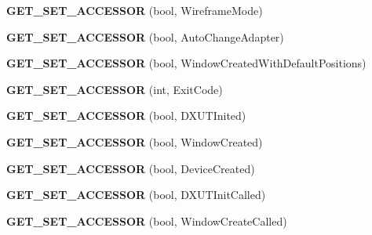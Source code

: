 \begin{DoxyCompactItemize}
\item 
\hypertarget{class_d_x_u_t_state_a59311ccadc02bef1fcce1ee052ceecb9}{{\bfseries G\+E\+T\+\_\+\+S\+E\+T\+\_\+\+A\+C\+C\+E\+S\+S\+O\+R} (bool, Wireframe\+Mode)}\label{class_d_x_u_t_state_a59311ccadc02bef1fcce1ee052ceecb9}

\item 
\hypertarget{class_d_x_u_t_state_a2bb10450426c21bb4a86a8b979d9afca}{{\bfseries G\+E\+T\+\_\+\+S\+E\+T\+\_\+\+A\+C\+C\+E\+S\+S\+O\+R} (bool, Auto\+Change\+Adapter)}\label{class_d_x_u_t_state_a2bb10450426c21bb4a86a8b979d9afca}

\item 
\hypertarget{class_d_x_u_t_state_af8afc1f310b2c7e1a68aa6730c142b6c}{{\bfseries G\+E\+T\+\_\+\+S\+E\+T\+\_\+\+A\+C\+C\+E\+S\+S\+O\+R} (bool, Window\+Created\+With\+Default\+Positions)}\label{class_d_x_u_t_state_af8afc1f310b2c7e1a68aa6730c142b6c}

\item 
\hypertarget{class_d_x_u_t_state_a00c1bce1dc49ad37f1d7a1d517bfe2c1}{{\bfseries G\+E\+T\+\_\+\+S\+E\+T\+\_\+\+A\+C\+C\+E\+S\+S\+O\+R} (int, Exit\+Code)}\label{class_d_x_u_t_state_a00c1bce1dc49ad37f1d7a1d517bfe2c1}

\item 
\hypertarget{class_d_x_u_t_state_a7170f07f98ca52e76967d166e7fc5323}{{\bfseries G\+E\+T\+\_\+\+S\+E\+T\+\_\+\+A\+C\+C\+E\+S\+S\+O\+R} (bool, D\+X\+U\+T\+Inited)}\label{class_d_x_u_t_state_a7170f07f98ca52e76967d166e7fc5323}

\item 
\hypertarget{class_d_x_u_t_state_a1c6c3de8f9aae7efa32d603d18953c13}{{\bfseries G\+E\+T\+\_\+\+S\+E\+T\+\_\+\+A\+C\+C\+E\+S\+S\+O\+R} (bool, Window\+Created)}\label{class_d_x_u_t_state_a1c6c3de8f9aae7efa32d603d18953c13}

\item 
\hypertarget{class_d_x_u_t_state_a80fe40845dbc6d77ee04510e15c929c0}{{\bfseries G\+E\+T\+\_\+\+S\+E\+T\+\_\+\+A\+C\+C\+E\+S\+S\+O\+R} (bool, Device\+Created)}\label{class_d_x_u_t_state_a80fe40845dbc6d77ee04510e15c929c0}

\item 
\hypertarget{class_d_x_u_t_state_af968f67a37e3c409770d52cbc5e68882}{{\bfseries G\+E\+T\+\_\+\+S\+E\+T\+\_\+\+A\+C\+C\+E\+S\+S\+O\+R} (bool, D\+X\+U\+T\+Init\+Called)}\label{class_d_x_u_t_state_af968f67a37e3c409770d52cbc5e68882}

\item 
\hypertarget{class_d_x_u_t_state_a5a0a83f318432262f0d1936453b5b776}{{\bfseries G\+E\+T\+\_\+\+S\+E\+T\+\_\+\+A\+C\+C\+E\+S\+S\+O\+R} (bool, Window\+Create\+Called)}\label{class_d_x_u_t_state_a5a0a83f318432262f0d1936453b5b776}


\end{DoxyCompactItemize}
